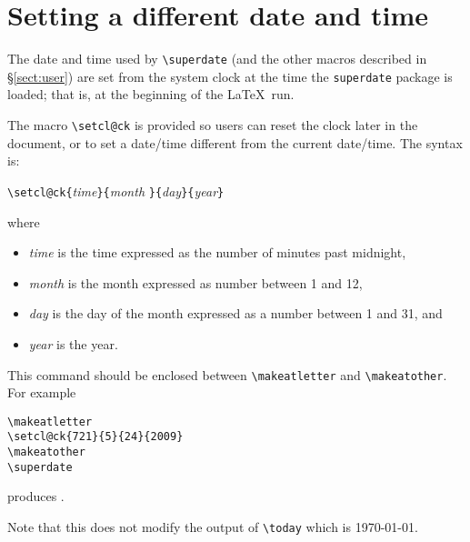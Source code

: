 \documentclass[12pt]{amsart}
\begin{document}
\section{Setting a different date and time}

The date and time used by \verb|\superdate| (and the other macros
described in \S\ref{sect:user}) are set from the system clock at the
time the \verb|superdate| package is loaded; that is, at the beginning
of the \LaTeX\ run.

The macro \verb|\setcl@ck| is provided so users can reset the clock
later in the document, or to set a date/time different from the
current date/time. The syntax is:

\noindent%
  \verb|\setcl@ck{|\emph{time}\verb|}{|\emph{month}%
    \verb|}{|\emph{day}\verb|}{|\emph{year}\verb|}|

\noindent where
\begin{itemize}
\item \emph{time} is the  time expressed as the number of
  minutes past midnight,
\item \emph{month} is the month expressed as number between 1 and 12,
\item \emph{day} is the day of the month expressed as a number between
  1 and 31, and
\item \emph{year} is the year.
\end{itemize}
This command should be enclosed between \verb|\makeatletter| and
\verb|\makeatother|. For example
\begin{verbatim}
\makeatletter
\setcl@ck{721}{5}{24}{2009}
\makeatother
\superdate
\end{verbatim}
\makeatletter%
%
\makeatother%
\renewcommand\superdateseparator{:}%
produces \superdate.

Note that this does not modify the output of \verb|\today| which is \today.
\end{document}
